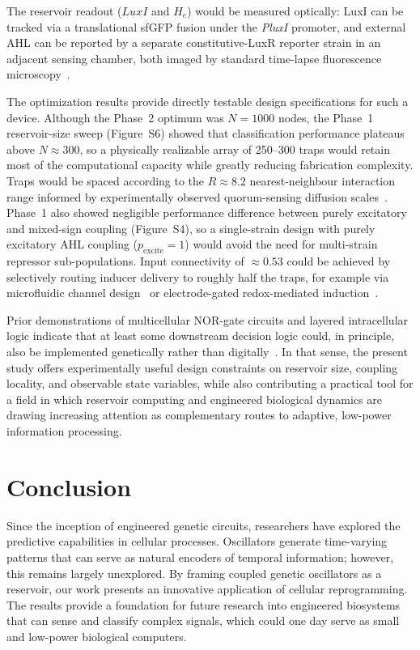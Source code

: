 \documentclass[journal=asbcd6,manuscript=article,keywords]{achemso}
\begin{document}
The reservoir readout ($LuxI$ and $H_e$) would be measured optically: LuxI can be tracked via a translational sfGFP fusion under the \textit{PluxI} promoter, and external AHL can be reported by a separate constitutive-LuxR reporter strain in an adjacent sensing chamber, both imaged by standard time-lapse fluorescence microscopy~\cite{Danino2010,Prindle2011}.

The optimization results provide directly testable design specifications for such a device.
Although the Phase~2 optimum was $N = 1000$ nodes, the Phase~1 reservoir-size sweep (Figure~S6) showed that classification performance plateaus above $N \approx 300$, so a physically realizable array of 250--300 traps would retain most of the computational capacity while greatly reducing fabrication complexity.
Traps would be spaced according to the $R \approx 8.2$ nearest-neighbour interaction range informed by experimentally observed quorum-sensing diffusion scales~\cite{Yanez2020}.
Phase~1 also showed negligible performance difference between purely excitatory and mixed-sign coupling (Figure~S4), so a single-strain design with purely excitatory AHL coupling ($p_{\mathrm{excite}} = 1$) would avoid the need for multi-strain repressor sub-populations.
Input connectivity of $\approx 0.53$ could be achieved by selectively routing inducer delivery to roughly half the traps, for example via microfluidic channel design~\cite{Rackus2015} or electrode-gated redox-mediated induction~\cite{Tschirhart2017}.

Prior demonstrations of multicellular NOR-gate circuits and layered intracellular logic indicate that at least some downstream decision logic could, in principle, also be implemented genetically rather than digitally~\cite{Tamsir2011,Moon2012}.
In that sense, the present study offers experimentally useful design constraints on reservoir size, coupling locality, and observable state variables, while also contributing a practical tool for a field in which reservoir computing and engineered biological dynamics are drawing increasing attention as complementary routes to adaptive, low-power information processing.

\section{Conclusion}

Since the inception of engineered genetic circuits, researchers have explored the predictive capabilities in cellular processes. Oscillators generate time-varying patterns that can serve as natural encoders of temporal information; however, this remains largely unexplored. By framing coupled genetic oscillators as a reservoir, our work presents an innovative application of cellular reprogramming. The results provide a foundation for future research into engineered biosystems that can sense and classify complex signals, which could one day serve as small and low-power biological computers.
\end{document}
